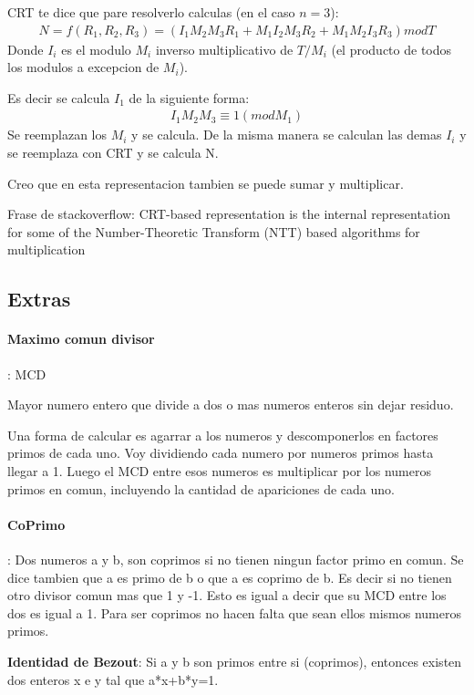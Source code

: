 \documentclass[12pt, oneside]{article}
\begin{document}
CRT te dice que pare resolverlo calculas (en el caso $n=3$):
\begin{align*}
  N = f(R_1,R_2,R_3) =  (I_1M_2M_3R_1 + M_1I_2M_3R_2 + M_1M_2I_3R_3) mod T
\end{align*}
Donde $I_i$ es el modulo $M_i$ inverso multiplicativo de $T/M_i$ (el producto
de todos los modulos a excepcion de $M_i$).

Es decir se calcula $I_1$ de la siguiente forma:
\begin{align*}
  I_1M_2M_3 \equiv 1 (mod M_1)
\end{align*}
Se reemplazan los $M_i$ y se calcula.
De la misma manera se calculan las demas $I_i$ y se reemplaza con CRT y se calcula N.

Creo que en esta representacion tambien se puede sumar y multiplicar.


Frase de stackoverflow: CRT-based representation is the internal representation
for some of the Number-Theoretic Transform (NTT) based algorithms for multiplication
\subsection{Extras}
\paragraph{Maximo comun divisor}: MCD

Mayor numero entero que divide a dos o mas numeros enteros sin dejar residuo.

Una forma de calcular es agarrar a los numeros y descomponerlos en factores primos de cada uno.
Voy dividiendo cada numero por numeros primos hasta llegar a 1.
Luego el MCD entre esos numeros es multiplicar por los numeros primos en comun, incluyendo
la cantidad de apariciones de cada uno.

\vspace{0.3cm}
\paragraph{CoPrimo}:
Dos numeros a y b, son coprimos si no tienen ningun factor primo en comun.
Se dice tambien que a es primo de b o que a es coprimo de b.
Es decir si no tienen otro divisor comun mas que 1 y -1.
Esto es igual a decir que su MCD entre los dos es igual a 1.
Para ser coprimos no hacen falta que sean ellos mismos numeros primos.

\textbf{Identidad de Bezout}: Si a y b son primos entre si (coprimos), entonces existen dos enteros x e y tal
que a*x+b*y=1.
\vspace{0.3cm}
\end{document}
